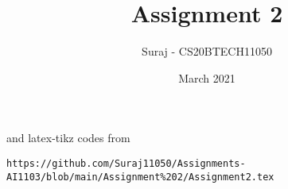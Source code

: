 \documentclass[journal,12pt,twocolumn]{IEEEtran}
\date{March 2021}
\DeclareMathOperator*{\Res}{Res}
\begin{document}
\newcommand{\BEQA}{\begin{eqnarray}}
\newcommand{\EEQA}{\end{eqnarray}}
\newcommand{\define}{\stackrel{\triangle}{=}}

\raggedbottom
\setlength{\parindent}{0pt}
\providecommand{\mbf}{\mathbf}
\providecommand{\pr}[1]{\ensuremath{\Pr\left(#1\right)}}
\providecommand{\qfunc}[1]{\ensuremath{Q\left(#1\right)}}
\providecommand{\fn}[1]{\ensuremath{f\left(#1\right)}}
\providecommand{\e}[1]{\ensuremath{E\left(#1\right)}}
\providecommand{\sbrak}[1]{\ensuremath{{}\left[#1\right]}}
\providecommand{\lsbrak}[1]{\ensuremath{{}\left[#1\right.}}
\providecommand{\rsbrak}[1]{\ensuremath{{}\left.#1\right]}}
\providecommand{\brak}[1]{\ensuremath{\left(#1\right)}}
\providecommand{\lbrak}[1]{\ensuremath{\left(#1\right.}}
\providecommand{\rbrak}[1]{\ensuremath{\left.#1\right)}}
\providecommand{\cbrak}[1]{\ensuremath{\left\{#1\right\}}}
\providecommand{\lcbrak}[1]{\ensuremath{\left\{#1\right.}}
\providecommand{\rcbrak}[1]{\ensuremath{\left.#1\right\}}}
\theoremstyle{remark}
\newtheorem{rem}{Remark}
\newcommand{\sgn}{\mathop{\mathrm{sgn}}}
\providecommand{\abs}[1]{\vert#1\vert}
\providecommand{\res}[1]{\Res\displaylimits_{#1}} 
\providecommand{\norm}[1]{\lVert#1\rVert}
\providecommand{\mtx}[1]{\mathbf{#1}}
\providecommand{\mean}[1]{E[ #1 ]}
\providecommand{\fourier}{\overset{\mathcal{F}}{ \rightleftharpoons}}
\providecommand{\system}{\overset{\mathcal{H}}{ \longleftrightarrow}}
\newcommand{\solution}{\noindent \textbf{Solution: }}
\newcommand{\Int}{\int\limits}
\newcommand{\cosec}{\,\text{cosec}\,}
\providecommand{\dec}[2]{\ensuremath{\overset{#1}{\underset{#2}{\gtrless}}}}
\newcommand{\myvec}[1]{\ensuremath{\begin{pmatrix}#1\end{pmatrix}}}
\newcommand{\mydet}[1]{\ensuremath{\begin{vmatrix}#1\end{vmatrix}}}
\makeatletter
\vspace{3cm}
\title{Assignment 2}
\author{Suraj - CS20BTECH11050}
\maketitle
\newpage
\bigskip
\renewcommand{\thetable}{\theenumi}

and latex-tikz codes from 
%
\begin{lstlisting}
https://github.com/Suraj11050/Assignments-AI1103/blob/main/Assignment%202/Assignment2.tex
\end{lstlisting}
\end{document}
